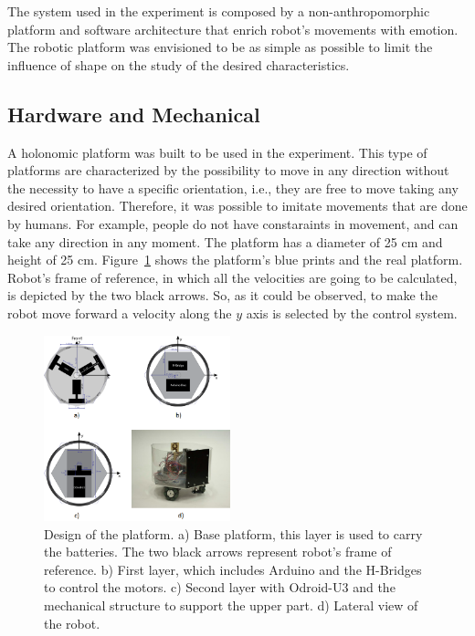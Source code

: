 
The system used in the experiment is composed by a non-anthropomorphic platform and software architecture that enrich robot's movements with emotion. The robotic platform was envisioned to be as simple as possible to limit the influence of shape on the study of the desired characteristics. 

\subsection{Hardware and Mechanical}

A holonomic platform was built to be used in the experiment. This type of platforms are characterized by the possibility to move in any direction without the necessity to have a specific orientation, i.e., they are free to move taking any desired orientation. Therefore, it was possible to imitate movements that are done by humans. For example, people do not have constaraints in movement, and can take any direction in any moment. The platform has a diameter of 25 cm and height of 25 cm. Figure~\ref{fig:ThirdDesign} shows the platform's blue prints and the real platform. Robot's frame of reference, in which all the velocities are going to be calculated, is depicted by the two black arrows. So, as it could be observed, to make the robot move forward a velocity along the $y$ axis is selected by the control system.

\begin{figure}
	\centering
	\includegraphics[width=0.48\textwidth]{Images/DesignThird.png} 
	\caption{Design of the platform. a) Base platform, this layer is used to carry the batteries. The two black arrows represent robot's frame of reference. b) First layer, which includes Arduino and the H-Bridges to control the motors. c) Second layer with Odroid-U3 and the mechanical structure to support the upper part. d) Lateral view of the robot.}
	\label{fig:ThirdDesign}
\end{figure}

